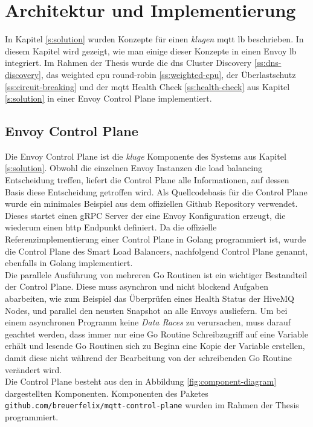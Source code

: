\section{Architektur und Implementierung} \label{s:implementation}
In Kapitel \ref{s:solution} wurden Konzepte für einen \textit{klugen} \ac{mqtt} \acl{lb} beschrieben. In diesem Kapitel wird gezeigt, wie man einige dieser Konzepte in einen Envoy \acl{lb} integriert.
Im Rahmen der Thesis wurde die \ac{dns} Cluster Discovery \ref{ss:dns-discovery}, das weighted \ac{cpu} round-robin \ref{ss:weighted-cpu}, der Überlastschutz \ref{ss:circuit-breaking} und der \ac{mqtt} Health Check \ref{ss:health-check} aus Kapitel \ref{s:solution} in einer Envoy Control Plane implementiert.

\subsection{Envoy Control Plane} \label{si:control-plane}
Die Envoy Control Plane ist die \textit{kluge} Komponente des Systems aus Kapitel \ref{s:solution}. Obwohl die einzelnen Envoy Instanzen die load balancing Entscheidung treffen, liefert die Control Plane alle Informationen, auf dessen Basis diese Entscheidung getroffen wird.
Als Quellcodebasis für die Control Plane wurde ein minimales Beispiel aus dem offiziellen Github Repository \cite{EnvoyproxyGocontrolplane} verwendet.
Dieses startet einen gRPC Server der eine Envoy Konfiguration erzeugt, die wiederum einen \ac{http} Endpunkt definiert. Da die offizielle Referenzimplementierung einer Control Plane in Golang programmiert ist, wurde die Control Plane des Smart Load Balancers, nachfolgend Control Plane genannt, ebenfalls in Golang implementiert.
\\
Die parallele Ausführung von mehreren Go Routinen ist ein wichtiger Bestandteil der Control Plane. Diese muss asynchron und nicht blockend Aufgaben abarbeiten, wie zum Beispiel das Überprüfen eines Health Status der HiveMQ Nodes, und parallel den neusten Snapshot an alle Envoys ausliefern.
Um bei einem asynchronen Programm keine \textit{Data Races} zu verursachen, muss darauf geachtet werden, dass immer nur eine Go Routine Schreibzugriff auf eine Variable erhält und lesende Go Routinen sich zu Beginn eine Kopie der Variable erstellen, damit diese nicht während der Bearbeitung von der schreibenden Go Routine verändert wird.
\\
Die Control Plane besteht aus den in Abbildung \ref{fig:component-diagram} dargestellten Komponenten. Komponenten des Paketes \verb|github.com/breuerfelix/mqtt-control-plane| wurden im Rahmen der Thesis programmiert.
